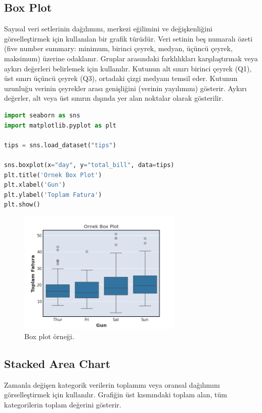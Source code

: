 \newpage

\subsection{Box Plot}
Sayısal veri setlerinin dağılımını, merkezi eğilimini ve değişkenliğini görselleştirmek için kullanılan bir grafik türüdür. Veri setinin beş numaralı özeti (five number summary: minimum, birinci çeyrek, medyan, üçüncü çeyrek, maksimum) üzerine odaklanır. Gruplar arasındaki farklılıkları karşılaştırmak veya aykırı değerleri belirlemek için kullanılır. Kutunun alt sınırı birinci çeyrek (Q1), üst sınırı üçüncü çeyrek (Q3), ortadaki çizgi medyanı temsil eder. Kutunun uzunluğu verinin çeyrekler arası genişliğini (verinin yayılımını) gösterir. Aykırı değerler, alt veya üst sınırın dışında yer alan noktalar olarak gösterilir.

\begin{lstlisting}[language=Python]
import seaborn as sns
import matplotlib.pyplot as plt

tips = sns.load_dataset("tips")

sns.boxplot(x="day", y="total_bill", data=tips)
plt.title('Ornek Box Plot')
plt.xlabel('Gun')
plt.ylabel('Toplam Fatura')
plt.show()
\end{lstlisting}

\begin{figure}[h]
    \centering
    \includegraphics[width=0.7\textwidth]{images/box_plot.png}
    \caption{Box plot örneği.}
    \label{fig:enter-label}
\end{figure}

\newpage

\subsection{Stacked Area Chart}
Zamanla değişen kategorik verilerin toplamını veya oransal dağılımını görselleştirmek için kullanılır. Grafiğin üst kısmındaki toplam alan, tüm kategorilerin toplam değerini gösterir.

